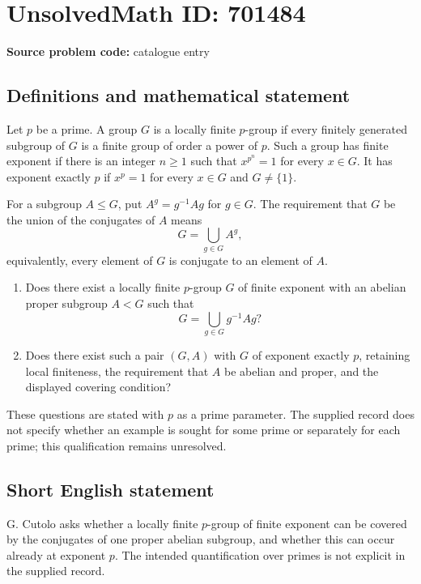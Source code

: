 \documentclass[11pt]{article}
\begin{document}
\section*{UnsolvedMath ID: 701484}
\textbf{Source problem code:} catalogue entry
\subsection{Definitions and mathematical statement}
Let \(p\) be a prime. A group \(G\) is a locally finite \(p\)-group if every finitely generated subgroup of \(G\) is a finite group of order a power of \(p\). Such a group has finite exponent if there is an integer \(n\geq 1\) such that \(x^{p^n}=1\) for every \(x\in G\). It has exponent exactly \(p\) if \(x^p=1\) for every \(x\in G\) and \(G\neq\{1\}\).

For a subgroup \(A\leq G\), put \(A^g=g^{-1}Ag\) for \(g\in G\). The requirement that \(G\) be the union of the conjugates of \(A\) means
\[
G=\bigcup_{g\in G}A^g,
\]
equivalently, every element of \(G\) is conjugate to an element of \(A\).

\begin{enumerate}
\item[(a)] Does there exist a locally finite \(p\)-group \(G\) of finite exponent with an abelian proper subgroup \(A<G\) such that
\[
G=\bigcup_{g\in G}g^{-1}Ag?
\]
\item[(b)] Does there exist such a pair \((G,A)\) with \(G\) of exponent exactly \(p\), retaining local finiteness, the requirement that \(A\) be abelian and proper, and the displayed covering condition?
\end{enumerate}

These questions are stated with \(p\) as a prime parameter. The supplied record does not specify whether an example is sought for some prime or separately for each prime; this qualification remains unresolved.
\subsection{Short English statement}
G. Cutolo asks whether a locally finite \(p\)-group of finite exponent can be covered by the conjugates of one proper abelian subgroup, and whether this can occur already at exponent \(p\). The intended quantification over primes is not explicit in the supplied record.
\end{document}
